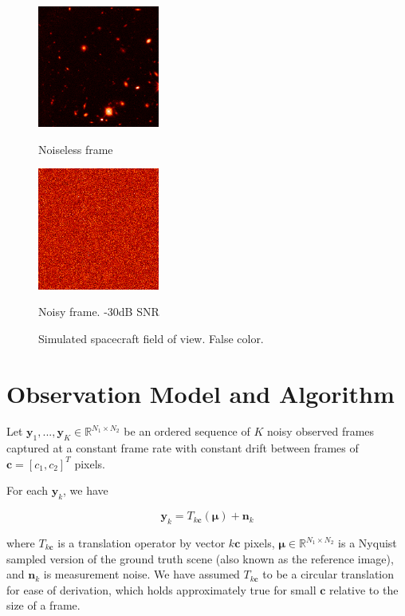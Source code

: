 \documentclass{article}
\begin{document}
\begin{figure}[htb]
\begin{minipage}[b]{.48\linewidth}
  \centering
  \centerline{\includegraphics[width=4.0cm]{images/frame_clean.png}}
  \centerline{Noiseless frame}\medskip
\end{minipage}
\hfill
\begin{minipage}[b]{0.48\linewidth}
  \centering
  \centerline{\includegraphics[width=4.0cm]{images/frame.png}}
  \centerline{Noisy frame. -30dB SNR}\medskip
\end{minipage}
  \caption{Simulated spacecraft field of view.  False color.}
\label{fig:scene}
\end{figure}

\section{Observation Model and Algorithm}
\label{sec:algorithm}

Let $\bm{y}_1, ..., \bm{y}_K \in \mathbb{R}^{N_1 \times N_2}$ be an ordered sequence of $K$ noisy observed frames captured at a constant frame rate with constant drift between frames of $\bm{c}=[c_1, c_2]^T$ pixels.

For each $\bm{y}_k$, we have

\begin{equation}
\bm{y}_k = T_{k\bm{c}}(\bm{\mu}) + \bm{n}_k
\label{eq:model}
\end{equation}


where $T_{k\bm{c}}$ is a translation operator by vector $k\bm{c}$ pixels, $\bm{\mu} \in \mathbb{R}^{N_1 \times N_2}$ is a Nyquist sampled version of the ground truth scene (also known as the reference image), and $\bm{n}_k$ is measurement noise.  We have assumed $T_{k\bm{c}}$ to be a circular translation for ease of derivation, which holds approximately true for small $\bm{c}$ relative to the size of a frame.
\end{document}
